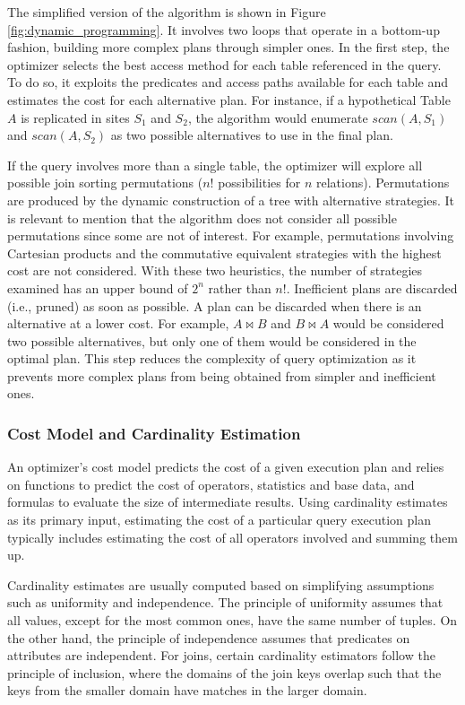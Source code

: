 The simplified version of the algorithm is shown in Figure \ref{fig:dynamic_programming}. It involves two loops that operate in a bottom-up fashion, building more complex plans through simpler ones. In the first step, the optimizer selects the best access method for each table referenced in the query. To do so, it exploits the predicates and access paths available for each table and estimates the cost for each alternative plan. For instance, if a hypothetical Table $A$ is replicated in sites $S_1$ and $S_2$, the algorithm would enumerate $scan (A, S_1)$ and $scan (A, S_2)$ as two possible alternatives to use in the final plan.

If the query involves more than a single table, the optimizer will explore all possible join sorting permutations ($n!$ possibilities for $n$ relations). Permutations are produced by the dynamic construction of a tree with alternative strategies. It is relevant to mention that the algorithm does not consider all possible permutations since some are not of interest. For example, permutations involving Cartesian products and the commutative equivalent strategies with the highest cost are not considered. With these two heuristics, the number of strategies examined has an upper bound of $2^n$ rather than $n!$. Inefficient plans are discarded (i.e., pruned) as soon as possible. A plan can be discarded when there is an alternative at a lower cost. For example, $A \bowtie B$ and $B \bowtie A$ would be considered two possible alternatives, but only one of them would be considered in the optimal plan. This step reduces the complexity of query optimization as it prevents more complex plans from being obtained from simpler and inefficient ones.

\subsubsection{Cost Model and Cardinality Estimation}

An optimizer's cost model predicts the cost of a given execution plan and relies on functions to predict the cost of operators, statistics and base data, and formulas to evaluate the size of intermediate results. Using cardinality estimates as its primary input, estimating the cost of a particular query execution plan typically includes estimating the cost of all operators involved and summing them up.

Cardinality estimates are usually computed based on simplifying assumptions such as uniformity and independence. The principle of uniformity assumes that all values, except for the most common ones, have the same number of tuples. On the other hand, the principle of independence assumes that predicates on attributes are independent. For joins, certain cardinality estimators follow the principle of inclusion, where the domains of the join keys overlap such that the keys from the smaller domain have matches in the larger domain.

